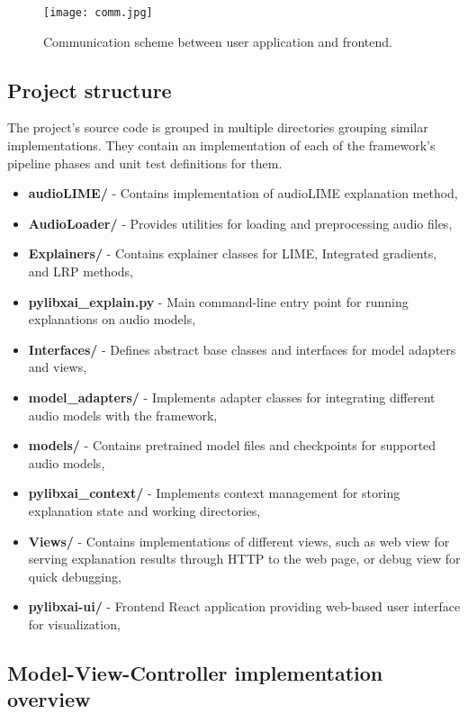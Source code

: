 \documentclass[
    bindingoffset=5mm,  %
    footnoteindent=3mm, %
    hyphenation=true    %
]{src/wut-thesis}
\begin{document}
\begin{figure}[h!] %
    \centering
    \texttt{[image: comm.jpg]}
    \caption{Communication scheme between user application and frontend.}
    \label{fig:CommunicationArchitecture}
\end{figure}

\subsection{Project structure}

    The project’s source code is grouped in multiple directories grouping similar implementations. They contain an implementation of each of the framework’s pipeline phases
    and unit test definitions for them.

\begin{itemize}[itemsep=1\baselineskip]
	\item \textbf{audioLIME/} - Contains implementation of audioLIME explanation method,
	\item \textbf{AudioLoader/} - Provides utilities for loading and preprocessing audio files,
	\item \textbf{Explainers/} - Contains explainer classes for LIME, Integrated gradients, and LRP methods,
	\item \textbf{pylibxai\_explain.py} - Main command-line entry point for running explanations on audio models,
	\item \textbf{Interfaces/} - Defines abstract base classes and interfaces for model adapters and views,
	\item \textbf{model\_adapters/} - Implements adapter classes for integrating different audio models with the framework,
	\item \textbf{models/} - Contains pretrained model files and checkpoints for supported audio models,
	\item \textbf{pylibxai\_context/} - Implements context management for storing explanation state and working directories,
	\item \textbf{Views/} - Contains implementations of different views, such as web view for serving explanation results through HTTP to the web page, or debug view for quick debugging,
	\item \textbf{pylibxai-ui/} - Frontend React application providing web-based user interface for visualization,
\end{itemize}

\subsection{Model-View-Controller implementation overview}
\end{document}
